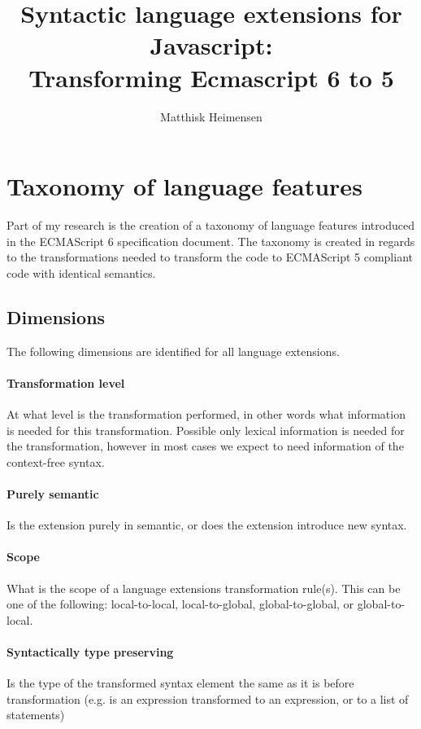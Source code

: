 \documentclass[10pt,a4paper]{article}
\title{%
	Syntactic language extensions for Javascript: \\
	\large Transforming Ecmascript 6 to 5}
\author{Matthisk Heimensen}
\begin{document}
	\maketitle
	\tableofcontents
\section{Taxonomy of language features}
Part of my research is the creation of a taxonomy of language features introduced in the ECMAScript 6 specification document. The taxonomy is created in regards to the transformations needed to transform the code to ECMAScript 5 compliant code with identical semantics.

\subsection{Dimensions}
The following dimensions are identified for all language extensions.

\paragraph{Transformation level}
At what level is the transformation performed, in other words what information is needed for this transformation. Possible only lexical information is needed for the transformation, however in most cases we expect to need information of the context-free syntax.

\paragraph{Purely semantic}
Is the extension purely in semantic, or does the extension introduce new syntax.

\paragraph{Scope}
What is the scope of a language extensions transformation rule(s). This can be one of the following: local-to-local, local-to-global, global-to-global, or global-to-local.

\paragraph{Syntactically type preserving}
Is the type of the transformed syntax element the same as it is before transformation (e.g. is an expression transformed to an expression, or to a list of statements)
\end{document}
